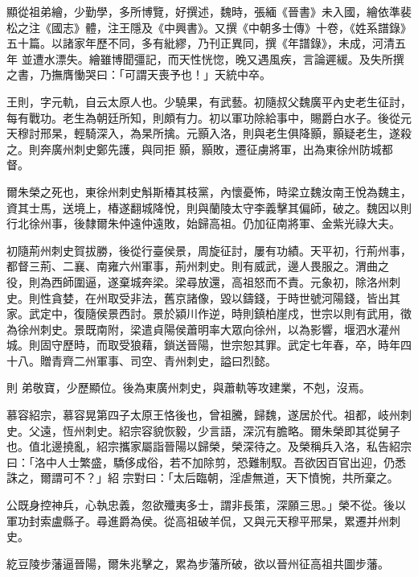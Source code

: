 \begin{pinyinscope}
 顯從祖弟繪，少勤學，多所博覽，好撰述，魏時，張緬《晉書》未入國，繪依準裴松之注《國志》體，注王隱及《中興書》。又撰《中朝多士傳》十卷，《姓系譜錄》五十篇。以諸家年歷不同，多有紕繆，乃刊正異同，撰《年譜錄》，未成，河清五年
 並遭水漂失。繪雖博聞彊記，而天性恍惚，晚又遇風疾，言論遲緩。及失所撰之書，乃撫膺慟哭曰：「可謂天喪予也！」天統中卒。



 王則，字元軌，自云太原人也。少驍果，有武藝。初隨叔父魏廣平內史老生征討，每有戰功。老生為朝廷所知，則頗有力。初以軍功除給事中，賜爵白水子。後從元天穆討邢杲，輕騎深入，為杲所擒。元顥入洛，則與老生俱降顥，顥疑老生，遂殺之。則奔廣州刺史鄭先護，與同拒
 顥，顥敗，遷征虜將軍，出為東徐州防城都督。



 爾朱榮之死也，東徐州刺史斛斯椿其枝黨，內懷憂怖，時梁立魏汝南王悅為魏主，資其士馬，送境上，椿遂翻城降悅，則與蘭陵太守李義擊其偏師，破之。魏因以則行北徐州事，後隸爾朱仲遠仲遠敗，始歸高祖。仍加征南將軍、金紫光祿大夫。



 初隨荊州刺史賀拔勝，後從行臺侯景，周旋征討，屢有功績。天平初，行荊州事，都督三荊、二襄、南雍六州軍事，荊州刺史。則有威武，邊人畏服之。渭曲之
 役，則為西師圍逼，遂棄城奔梁。梁尋放還，高祖怒而不責。元象初，除洛州刺史。則性貪婪，在州取受非法，舊京諸像，毀以鑄錢，于時世號河陽錢，皆出其家。武定中，復隨侯景西討。景於潁川作逆，時則鎮柏崖戍，世宗以則有武用，徵為徐州刺史。景既南附，梁遣貞陽侯蕭明率大眾向徐州，以為影響，堰泗水灌州城。則固守歷時，而取受狼藉，鎖送晉陽，世宗恕其罪。武定七年春，卒，時年四十八。贈青齊二州軍事、司空、青州刺史，謚曰烈懿。



 則
 弟敬寶，少歷顯位。後為東廣州刺史，與蕭軌等攻建業，不剋，沒焉。



 慕容紹宗，慕容晃第四子太原王恪後也，曾祖騰，歸魏，遂居於代。祖都，岐州刺史。父遠，恆州刺史。紹宗容貌恢毅，少言語，深沉有膽略。爾朱榮即其從舅子也。值北邊撓亂，紹宗攜家屬詣晉陽以歸榮，榮深待之。及榮稱兵入洛，私告紹宗曰：「洛中人士繁盛，驕侈成俗，若不加除剪，恐難制馭。吾欲因百官出迎，仍悉誅之，爾謂可不？」紹
 宗對曰：「太后臨朝，淫虐無道，天下憤惋，共所棄之。



 公既身控神兵，心執忠義，忽欲殲夷多士，謂非長策，深願三思。」榮不從。後以軍功封索盧縣子。尋進爵為侯。從高祖破羊侃，又與元天穆平邢杲，累遷并州刺史。



 紇豆陵步藩逼晉陽，爾朱兆擊之，累為步藩所破，欲以晉州征高祖共圖步藩。




\end{pinyinscope}

